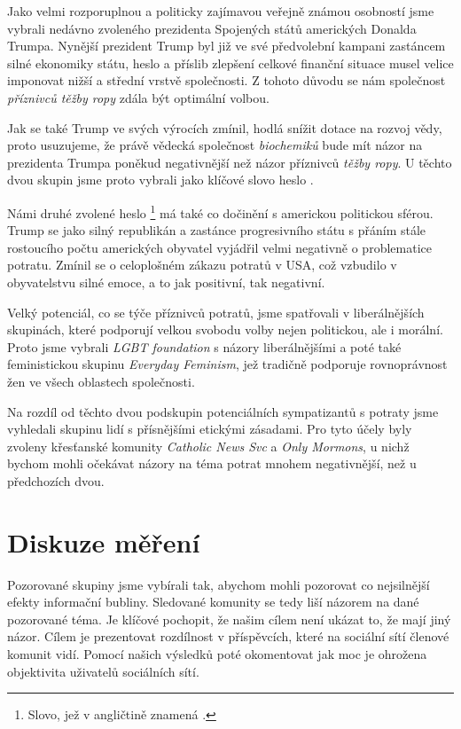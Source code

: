 \documentclass[12pt, a4paper]{article}
\numberwithin{equation}{section} 	%
\begin{document}
Jako velmi rozporuplnou a politicky zajímavou veřejně známou osobností jsme vybrali nedávno zvoleného prezidenta Spojených států amerických Donalda Trumpa. Nynější prezident Trump byl již ve své předvolební kampani zastáncem silné ekonomiky státu, heslo  a příslib zlepšení celkové finanční situace musel velice imponovat nižší a střední vrstvě společnosti. Z tohoto důvodu se nám společnost \textit{příznivců těžby ropy} zdála být optimální volbou.

Jak se také Trump ve svých výrocích zmínil, hodlá snížit dotace na rozvoj vědy, proto usuzujeme, že právě vědecká společnost \textit{biochemiků} bude mít názor na prezidenta Trumpa poněkud negativnější než názor příznivců \textit{těžby ropy}. U těchto dvou skupin jsme proto vybrali jako klíčové slovo heslo \textit{}.

Námi druhé zvolené heslo \textit{}\footnote{Slovo, jež v angličtině znamená \textit{}.} má také co dočinění s americkou politickou sférou. Trump se jako silný republikán a zastánce progresivního státu s přáním stále rostoucího počtu amerických obyvatel vyjádřil velmi negativně o problematice potratu. Zmínil se o celoplošném zákazu potratů v USA, což vzbudilo v obyvatelstvu silné emoce, a to jak positivní, tak negativní.

Velký potenciál, co se týče příznivců potratů, jsme spatřovali v liberálnějších skupinách, které podporují velkou svobodu volby nejen politickou, ale i morální. Proto jsme vybrali \textit{LGBT foundation} s názory liberálnějšími a poté také feministickou skupinu \textit{Everyday Feminism}, jež tradičně podporuje rovnoprávnost žen ve všech oblastech společnosti.

Na rozdíl od těchto dvou podskupin potenciálních sympatizantů s potraty jsme vyhledali skupinu lidí s přísnějšími etickými zásadami. Pro tyto účely byly zvoleny křesťanské komunity \textit{Catholic News Svc} a \textit{Only Mormons}, u nichž bychom mohli očekávat názory na téma potrat mnohem negativnější, než u předchozích dvou.


\section{Diskuze měření}
\noindent Pozorované skupiny jsme vybírali tak, abychom mohli pozorovat co nejsilnější efekty informační bubliny. Sledované komunity se tedy liší názorem na dané pozorované téma.  Je klíčové pochopit, že našim cílem není ukázat to, že mají jiný názor. Cílem je prezentovat rozdílnost v příspěvcích, které na sociální sítí členové komunit vidí. Pomocí našich výsledků poté okomentovat jak moc je ohrožena objektivita uživatelů sociálních sítí.
\end{document}
